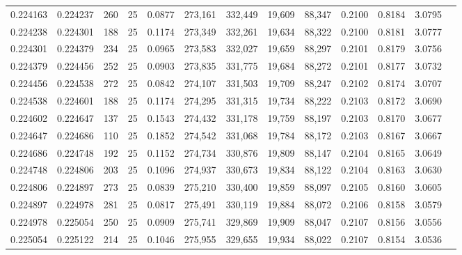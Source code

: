 \begin{tabular}{rrrrrrrrrrrrr}
0.224163 & 0.224237 &   260 &  25 &                                     0.0877 & 273,161 & 332,449 &  19,609 &  88,347 & 0.2100 & 0.8184 & 3.0795 \\
0.224238 & 0.224301 &   188 &  25 &                                     0.1174 & 273,349 & 332,261 &  19,634 &  88,322 & 0.2100 & 0.8181 & 3.0777 \\
0.224301 & 0.224379 &   234 &  25 &                                     0.0965 & 273,583 & 332,027 &  19,659 &  88,297 & 0.2101 & 0.8179 & 3.0756 \\
0.224379 & 0.224456 &   252 &  25 &                                     0.0903 & 273,835 & 331,775 &  19,684 &  88,272 & 0.2101 & 0.8177 & 3.0732 \\
0.224456 & 0.224538 &   272 &  25 &                                     0.0842 & 274,107 & 331,503 &  19,709 &  88,247 & 0.2102 & 0.8174 & 3.0707 \\
0.224538 & 0.224601 &   188 &  25 &                                     0.1174 & 274,295 & 331,315 &  19,734 &  88,222 & 0.2103 & 0.8172 & 3.0690 \\
0.224602 & 0.224647 &   137 &  25 &                                     0.1543 & 274,432 & 331,178 &  19,759 &  88,197 & 0.2103 & 0.8170 & 3.0677 \\
0.224647 & 0.224686 &   110 &  25 &                                     0.1852 & 274,542 & 331,068 &  19,784 &  88,172 & 0.2103 & 0.8167 & 3.0667 \\
0.224686 & 0.224748 &   192 &  25 &                                     0.1152 & 274,734 & 330,876 &  19,809 &  88,147 & 0.2104 & 0.8165 & 3.0649 \\
0.224748 & 0.224806 &   203 &  25 &                                     0.1096 & 274,937 & 330,673 &  19,834 &  88,122 & 0.2104 & 0.8163 & 3.0630 \\
0.224806 & 0.224897 &   273 &  25 &                                     0.0839 & 275,210 & 330,400 &  19,859 &  88,097 & 0.2105 & 0.8160 & 3.0605 \\
0.224897 & 0.224978 &   281 &  25 &                                     0.0817 & 275,491 & 330,119 &  19,884 &  88,072 & 0.2106 & 0.8158 & 3.0579 \\
0.224978 & 0.225054 &   250 &  25 &                                     0.0909 & 275,741 & 329,869 &  19,909 &  88,047 & 0.2107 & 0.8156 & 3.0556 \\
0.225054 & 0.225122 &   214 &  25 &                                     0.1046 & 275,955 & 329,655 &  19,934 &  88,022 & 0.2107 & 0.8154 & 3.0536 \\

\end{tabular}
